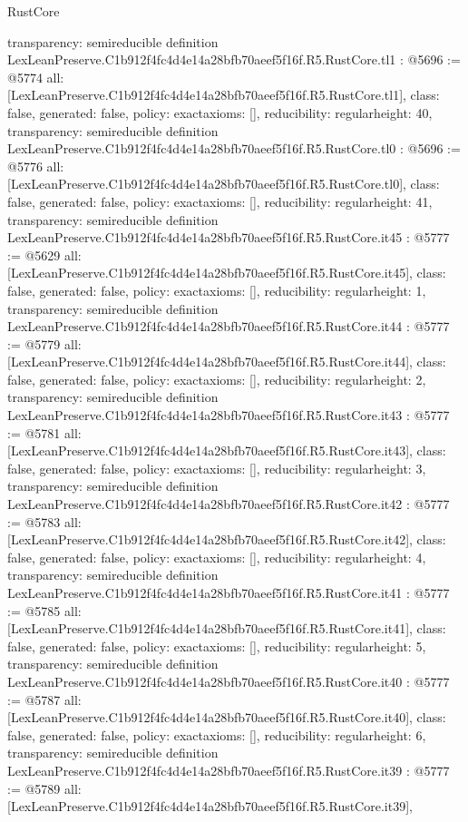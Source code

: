 \begin{lexlean}{RustCore}
\begin{coremodule}
{  transparency: semireducible
}
definition LexLeanPreserve.C1b912f4fc4d4e14a28bfb70aeef5f16f.R5.RustCore.tl1 : @5696 := @5774 {
  all: [LexLeanPreserve.C1b912f4fc4d4e14a28bfb70aeef5f16f.R5.RustCore.tl1],
  class: false,
  generated: false,
  policy: exact{axioms: []},
  reducibility: regular{height: 40},
  transparency: semireducible
}
definition LexLeanPreserve.C1b912f4fc4d4e14a28bfb70aeef5f16f.R5.RustCore.tl0 : @5696 := @5776 {
  all: [LexLeanPreserve.C1b912f4fc4d4e14a28bfb70aeef5f16f.R5.RustCore.tl0],
  class: false,
  generated: false,
  policy: exact{axioms: []},
  reducibility: regular{height: 41},
  transparency: semireducible
}
definition LexLeanPreserve.C1b912f4fc4d4e14a28bfb70aeef5f16f.R5.RustCore.it45 : @5777 := @5629 {
  all: [LexLeanPreserve.C1b912f4fc4d4e14a28bfb70aeef5f16f.R5.RustCore.it45],
  class: false,
  generated: false,
  policy: exact{axioms: []},
  reducibility: regular{height: 1},
  transparency: semireducible
}
definition LexLeanPreserve.C1b912f4fc4d4e14a28bfb70aeef5f16f.R5.RustCore.it44 : @5777 := @5779 {
  all: [LexLeanPreserve.C1b912f4fc4d4e14a28bfb70aeef5f16f.R5.RustCore.it44],
  class: false,
  generated: false,
  policy: exact{axioms: []},
  reducibility: regular{height: 2},
  transparency: semireducible
}
definition LexLeanPreserve.C1b912f4fc4d4e14a28bfb70aeef5f16f.R5.RustCore.it43 : @5777 := @5781 {
  all: [LexLeanPreserve.C1b912f4fc4d4e14a28bfb70aeef5f16f.R5.RustCore.it43],
  class: false,
  generated: false,
  policy: exact{axioms: []},
  reducibility: regular{height: 3},
  transparency: semireducible
}
definition LexLeanPreserve.C1b912f4fc4d4e14a28bfb70aeef5f16f.R5.RustCore.it42 : @5777 := @5783 {
  all: [LexLeanPreserve.C1b912f4fc4d4e14a28bfb70aeef5f16f.R5.RustCore.it42],
  class: false,
  generated: false,
  policy: exact{axioms: []},
  reducibility: regular{height: 4},
  transparency: semireducible
}
definition LexLeanPreserve.C1b912f4fc4d4e14a28bfb70aeef5f16f.R5.RustCore.it41 : @5777 := @5785 {
  all: [LexLeanPreserve.C1b912f4fc4d4e14a28bfb70aeef5f16f.R5.RustCore.it41],
  class: false,
  generated: false,
  policy: exact{axioms: []},
  reducibility: regular{height: 5},
  transparency: semireducible
}
definition LexLeanPreserve.C1b912f4fc4d4e14a28bfb70aeef5f16f.R5.RustCore.it40 : @5777 := @5787 {
  all: [LexLeanPreserve.C1b912f4fc4d4e14a28bfb70aeef5f16f.R5.RustCore.it40],
  class: false,
  generated: false,
  policy: exact{axioms: []},
  reducibility: regular{height: 6},
  transparency: semireducible
}
definition LexLeanPreserve.C1b912f4fc4d4e14a28bfb70aeef5f16f.R5.RustCore.it39 : @5777 := @5789 {
  all: [LexLeanPreserve.C1b912f4fc4d4e14a28bfb70aeef5f16f.R5.RustCore.it39],
}
\end{coremodule}
\end{lexlean}
